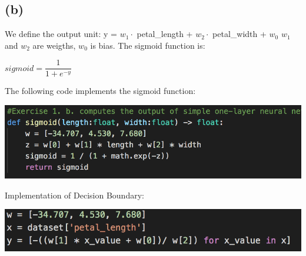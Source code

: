 \documentclass[12pt]{article}
\begin{document}
\subsection*{(b)}
We define the output unit: y = $w_1 \cdot$ petal\_length + $w_2 \cdot$ petal\_width + $w_0$
$w_1$ and $w_2$ are weigths, $w_0$ is bias.
The sigmoid function is: 
\begin{center}
    $sigmoid = \dfrac{1}{1 + e^{-y}}$

\end{center}
The following code implements the sigmoid function: 
\begin{center}
    \includegraphics[scale=0.50]{fig/ai1b2}
\end{center}
Implementation of Decision Boundary:
\begin{center}
    \includegraphics[scale=0.50]{fig/ai1c2}
\end{center}
\end{document}
